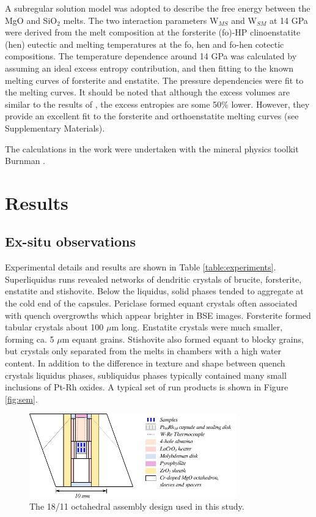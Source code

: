 \documentclass[review]{elsarticle}
\begin{document}
A subregular solution model was adopted to describe the free energy between the MgO and SiO$_2$ melts. The two interaction parameters W$_{MS}$ and W$_{SM}$ at 14 GPa were derived from the melt composition at the forsterite (fo)-HP clinoenstatite (hen) eutectic \citep{PWMW1998} and melting temperatures at the fo, hen and fo-hen cotectic compositions. The temperature dependence around 14 GPa was calculated by assuming an ideal excess entropy contribution, and then fitting to the known melting curves of forsterite and enstatite. The pressure dependencies were fit to the melting curves. It should be noted that although the excess volumes are similar to the results of \cite{DKS2013}, the excess entropies are some 50\% lower. However, they provide an excellent fit to the forsterite and orthoenstatite melting curves (see Supplementary Materials).

The calculations in the work were undertaken with the mineral physics toolkit Burnman \citep[available from \url{https://geodynamics.org/cig/software/burnman/}][]{CHRU2014}.

\clearpage
\section{Results}
\subsection{Ex-situ observations}
Experimental details and results are shown in Table \ref{table:experiments}. Superliquidus runs revealed networks of dendritic crystals of brucite, forsterite, enstatite and stishovite. Below the liquidus, solid phases tended to aggregate at the cold end of the capsules. Periclase formed equant crystals often associated with quench overgrowths which appear brighter in BSE images. Forsterite formed tabular crystals about 100 $\mu$m long. Enstatite crystals were much smaller, forming ca. 5 $\mu$m equant grains. Stishovite also formed equant to blocky grains, but crystals only separated from the melts in chambers with a high water content. In addition to the difference in texture and shape between quench crystals liquidus phases, subliquidus phases typically contained many small inclusions of Pt-Rh oxides. A typical set of run products is shown in Figure \ref{fig:sem}.

\begin{figure}[h!]
  \centering
      \includegraphics[width=0.8\textwidth]{figures/assembly}
  \caption{The 18/11 octahedral assembly design used in this study.}
  \label{fig:assembly}
\end{figure}
\end{document}

